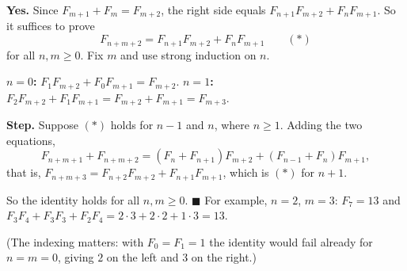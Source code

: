 \textbf{Yes.} Since $F_{m+1}+F_m=F_{m+2}$, the right side equals $F_{n+1}F_{m+2}+F_nF_{m+1}$. So it suffices to prove
\[F_{n+m+2}=F_{n+1}F_{m+2}+F_nF_{m+1}\qquad(\ast)\]
for all $n,m\ge0$. Fix $m$ and use strong induction on $n$.

\textbf{$n=0$:} $F_1F_{m+2}+F_0F_{m+1}=F_{m+2}$. \textbf{$n=1$:} $F_2F_{m+2}+F_1F_{m+1}=F_{m+2}+F_{m+1}=F_{m+3}$.

\textbf{Step.} Suppose $(\ast)$ holds for $n-1$ and $n$, where $n\ge1$. Adding the two equations,
\[F_{n+m+1}+F_{n+m+2}=\left(F_n+F_{n+1}\right)F_{m+2}+\left(F_{n-1}+F_n\right)F_{m+1},\]
that is, $F_{n+m+3}=F_{n+2}F_{m+2}+F_{n+1}F_{m+1}$, which is $(\ast)$ for $n+1$.

So the identity holds for all $n,m\ge0$. $\blacksquare$ For example, $n=2$, $m=3$: $F_7=13$ and $F_3F_4+F_3F_3+F_2F_4=2\cdot3+2\cdot2+1\cdot3=13$.

(The indexing matters: with $F_0=F_1=1$ the identity would fail already for $n=m=0$, giving $2$ on the left and $3$ on the right.)
